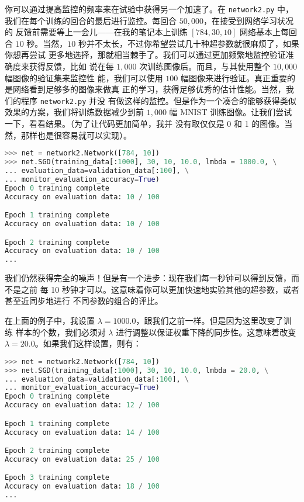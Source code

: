 你可以通过提高监控的频率来在试验中获得另一个加速了。在 \lstinline!network2.py!
中，我们在每个训练的回合的最后进行监控。每回合 $50,000$，在接受到网络学习状况的
反馈前需要等上一会儿——在我的笔记本上训练 $[784, 30, 10]$ 网络基本上每回合 $10$
秒。当然，$10$ 秒并不太长，不过你希望尝试几十种超参数就很麻烦了，如果你想再尝试
更多地选择，那就相当棘手了。我们可以通过更加频繁地监控验证准确度来获得反馈，比如
说在每 $1,000$ 次训练图像后。而且，与其使用整个 $10,000$ 幅图像的验证集来监控性
能，我们可以使用 $100$ 幅图像来进行验证。真正重要的是网络看到足够多的图像来做真
正的学习，获得足够优秀的估计性能。当然，我们的程序 \lstinline!network2.py! 并没
有做这样的监控。但是作为一个凑合的能够获得类似效果的方案，我们将训练数据减少到前
$1,000$ 幅 MNIST 训练图像。让我们尝试一下，看看结果。（为了让代码更加简单，我并
  没有取仅仅是 0 和 1 的图像。当然，那样也是很容易就可以实现）。
\begin{lstlisting}[language=Python]
>>> net = network2.Network([784, 10])
>>> net.SGD(training_data[:1000], 30, 10, 10.0, lmbda = 1000.0, \
... evaluation_data=validation_data[:100], \
... monitor_evaluation_accuracy=True)
Epoch 0 training complete
Accuracy on evaluation data: 10 / 100

Epoch 1 training complete
Accuracy on evaluation data: 10 / 100

Epoch 2 training complete
Accuracy on evaluation data: 10 / 100
...
\end{lstlisting}

我们仍然获得完全的噪声！但是有一个进步：现在我们每一秒钟可以得到反馈，而不是之前
每 10 秒钟才可以。这意味着你可以更加快速地实验其他的超参数，或者甚至近同步地进行
不同参数的组合的评比。

在上面的例子中，我设置 $\lambda=1000.0$，跟我们之前一样。但是因为这里改变了训练
样本的个数，我们必须对 $\lambda$ 进行调整以保证权重下降的同步性。这意味着改变
$\lambda = 20.0$。如果我们这样设置，则有：

\begin{lstlisting}[language=Python]
>>> net = network2.Network([784, 10])
>>> net.SGD(training_data[:1000], 30, 10, 10.0, lmbda = 20.0, \
... evaluation_data=validation_data[:100], \
... monitor_evaluation_accuracy=True)
Epoch 0 training complete
Accuracy on evaluation data: 12 / 100

Epoch 1 training complete
Accuracy on evaluation data: 14 / 100

Epoch 2 training complete
Accuracy on evaluation data: 25 / 100

Epoch 3 training complete
Accuracy on evaluation data: 18 / 100
...
\end{lstlisting}

